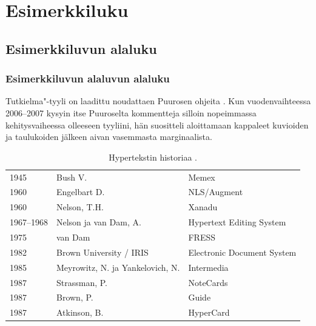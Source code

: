 \chapter{Esimerkkiluku}

\section{Esimerkkiluvun alaluku}

\subsection{Esimerkkiluvun alaluvun alaluku}

Tutkielma"-tyyli on laadittu noudattaen Puurosen ohjeita \citep{Puuronen2002Ohjeita-tutkimusraportin-kirjoittajalle}. Kun vuodenvaihteessa 2006--2007 kysyin itse Puuroselta kommentteja silloin nopeimmassa kehitysvaiheessa olleeseen tyyliini, hän suositteli aloittamaan kappaleet kuvioiden  ja taulukoiden  jälkeen aivan vasemmasta marginaalista.

\begin{table}[h!]
\caption{Hypertekstin historiaa \citep[6--9]{Heimburg1989Hyperjarjestelmat}.}
\centering
\begin{tabular}{lll}
    1945        & Bush V.                   & Memex                     \\
    1960        & Engelbart D.              & NLS/Augment               \\
    1960        & Nelson, T.H.              & Xanadu                    \\
    1967--1968  & Nelson ja van Dam, A.       & Hypertext Editing System  \\
    1975        & van Dam                   & FRESS                     \\
    1982        & Brown University / IRIS   & Electronic Document System\\
    1985        & Meyrowitz, N. ja Yankelovich, N. & Intermedia          \\
    1987        & Strassman, P.             & NoteCards                 \\
    1987        & Brown, P.                 & Guide                     \\
    1987        & Atkinson, B.              & HyperCard                 \\
\end{tabular}
\label{tbl:Hypertekstin-historiaa}
\end{table}

